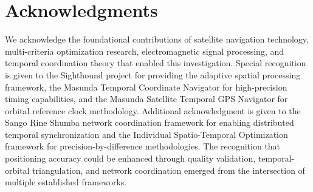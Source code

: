 \documentclass[12pt,a4paper]{article}
\begin{document}
\section*{Acknowledgments}
We acknowledge the foundational contributions of satellite navigation technology, multi-criteria optimization research, electromagnetic signal processing, and temporal coordination theory that enabled this investigation. Special recognition is given to the Sighthound project for providing the adaptive spatial processing framework, the Masunda Temporal Coordinate Navigator for high-precision timing capabilities, and the Masunda Satellite Temporal GPS Navigator for orbital reference clock methodology. Additional acknowledgment is given to the Sango Rine Shumba network coordination framework for enabling distributed temporal synchronization and the Individual Spatio-Temporal Optimization framework for precision-by-difference methodologies. The recognition that positioning accuracy could be enhanced through quality validation, temporal-orbital triangulation, and network coordination emerged from the intersection of multiple established frameworks.
\end{document}
